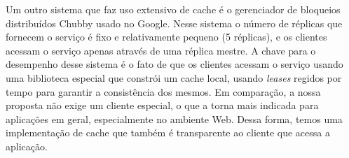 Um outro sistema que faz uso extensivo de cache é o gerenciador de bloqueios distribuídos
Chubby \cite{burrows06} usado no Google. Nesse sistema o número de réplicas que fornecem o
serviço é fixo e relativamente pequeno (5 réplicas), e os clientes acessam o serviço
apenas através de uma réplica mestre. A chave para o desempenho desse sistema é o fato de
que os clientes acessam o serviço usando uma biblioteca especial que constrói um cache
local, usando \emph{leases} regidos por tempo \cite{lampson96} para garantir a
consistência dos mesmos. Em comparação, a nossa proposta não exige um cliente especial, o
que a torna mais indicada para aplicações em geral, especialmente no ambiente Web. Dessa
forma, temos uma implementação de cache que também é transparente ao cliente que acessa a
aplicação.


